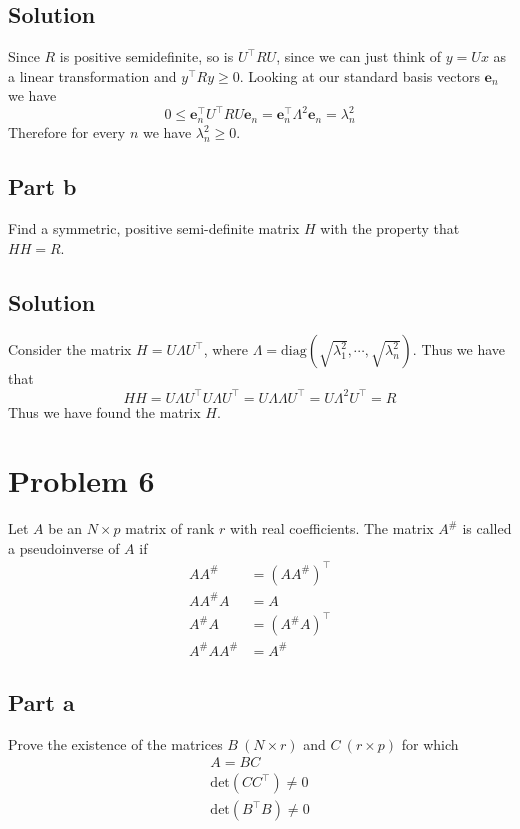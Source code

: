 \documentclass[a4paper]{article}
\begin{document}
\subsection*{Solution}%
Since $R$ is positive semidefinite, so is $U^\top RU$, since we can just think of $y = Ux$ as a linear transformation and $y^\top R y \geq 0$. Looking at our standard basis vectors $\mathbf{e}_n$ we have
\[
  0 \leq \mathbf{e}_n^\top U^\top R U \mathbf{e}_n = \mathbf{e}_n^\top \Lambda^2 \mathbf{e}_n = \lambda_n^2
\]
Therefore for every $n$ we have $\lambda^2_n \geq 0$.

\subsection*{Part b}%
Find a symmetric, positive semi-definite matrix $H$ with the property that $HH = R$.

\subsection*{Solution}%
Consider the matrix $H = U\Lambda U^\top$, where $\Lambda = \text{diag}(\sqrt{\lambda_1^2}, \cdots, \sqrt{\lambda_n^2})$. Thus we have that
\[
  HH = U\Lambda U^\top U \Lambda U^\top = U\Lambda \Lambda U^\top = U \Lambda^2 U^\top = R
\]
Thus we have found the matrix $H$.

\section*{Problem 6}%
Let $A$ be an $N \times p$ matrix of rank $r$ with real coefficients. The matrix $A^{\#}$ is called a pseudoinverse of $A$ if
\[
  \begin{aligned}
    AA^{\#} &= (AA^{\#})^\top \\
    AA^{\#}A &= A \\
    A^{\#}A &= (A^{\#}A)^\top \\
    A^{\#}AA^{\#} &= A^{\#}
  \end{aligned}
\]

\subsection*{Part a}%
Prove the existence of the matrices $B\ (N \times r)$ and $C\ (r \times p)$ for which 
\[
  \begin{aligned}
    A = BC \\
    \text{det}(CC^\top) \neq 0 \\
    \text{det}(B^\top B) \neq 0
  \end{aligned}
\]
\end{document}
